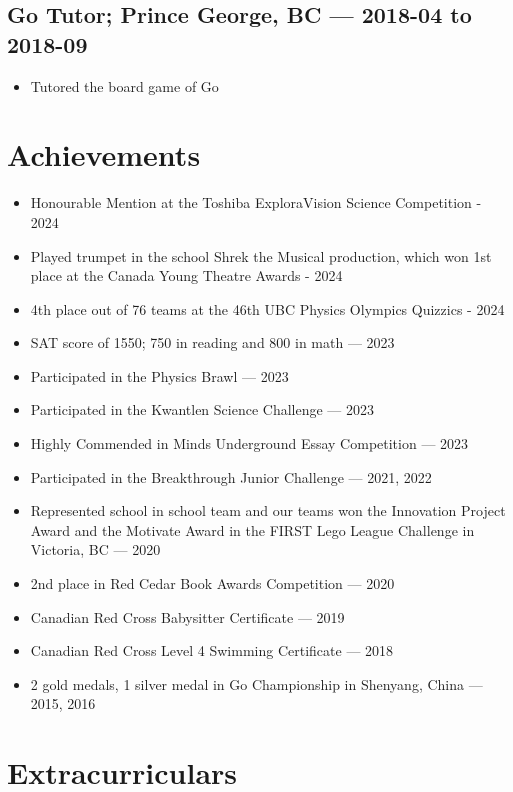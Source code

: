 \documentclass{article}
\begin{document}
\subsection*{Go Tutor; Prince George, BC — 2018-04 to 2018-09}

\begin{itemize}
\item Tutored the board game of Go
\end{itemize}

\section*{Achievements}%

\begin{itemize}
\item Honourable Mention at the Toshiba ExploraVision Science Competition - 2024
\item Played trumpet in the school Shrek the Musical production, which won 1st place at the Canada Young Theatre Awards - 2024
\item 4th place out of 76 teams at the 46th UBC Physics Olympics Quizzics - 2024
\item SAT score of 1550; 750 in reading and 800 in math — 2023
\item Participated in the Physics Brawl — 2023
\item Participated in the Kwantlen Science Challenge — 2023
\item Highly Commended in Minds Underground Essay Competition — 2023
\item Participated in the Breakthrough Junior Challenge — 2021, 2022
\item Represented school in school team and our teams won the Innovation Project Award and the Motivate Award in the FIRST Lego League Challenge in Victoria, BC — 2020
\item 2nd place in Red Cedar Book Awards Competition — 2020
\item Canadian Red Cross Babysitter Certificate — 2019
\item Canadian Red Cross Level 4 Swimming Certificate — 2018
\item 2 gold medals, 1 silver medal in Go Championship in Shenyang, China — 2015, 2016
\end{itemize}

\section*{Extracurriculars}%
\end{document}
